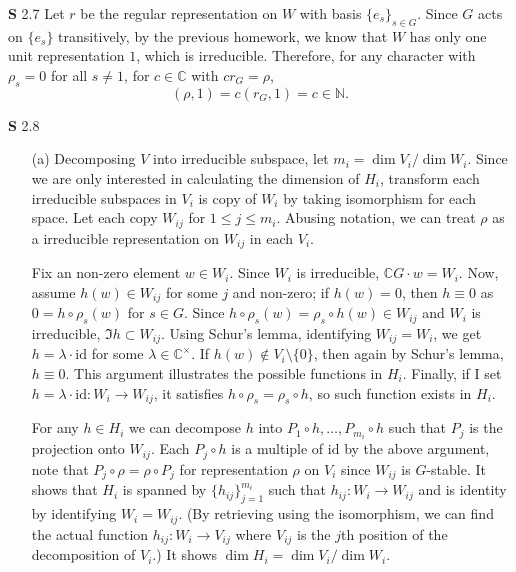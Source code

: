 \documentclass[a4paper, 12pt]{article}
\theoremstyle{Mydefinition}
\theoremstyle{Mytheorem}
\begin{document}
\noindent \textbf{S} 2.7
Let $r$ be the regular representation on $W$ with basis $\{e_s\}_{s\in G}$. Since $G$ acts on $\{e_s\}$ transitively, by the previous homework, we know that $W$ has only one unit representation $1$, which is irreducible. Therefore, for any character with $\rho_s = 0$ for all $s\neq 1$, for $c\in \mathbb{C}$ with $cr_G = \rho$,
\begin{equation}
    (\rho, 1) = c(r_G, 1) = c\in \mathbb{N}.
\end{equation}

\noindent \textbf{S} 2.8
\begin{enumerate}
    \item[(a)] Decomposing $V$ into irreducible subspace, let $m_i = \dim V_i/\dim W_i$. Since we are only interested in calculating the dimension of $H_i$, transform each irreducible subspaces in $V_i$ is copy of $W_i$ by taking isomorphism for each space. Let each copy $W_{ij}$ for $1\leq j\leq m_i$. Abusing notation, we can treat $\rho$ as a irreducible representation on $W_{ij}$ in each $V_i$.
    
    Fix an non-zero element $w\in W_i$. Since $W_i$ is irreducible, $\mathbb{C}G\cdot w = W_i$. Now, assume $h(w)\in W_{ij}$ for some $j$ and non-zero; if $h(w) = 0$, then $h\equiv 0$ as $0 = h\circ \rho_s(w)$ for $s\in G$. Since $h\circ \rho_s(w) = \rho_s\circ h(w)\in W_{ij}$ and $W_i$ is irreducible, $\Im h\subset W_{ij}$. Using Schur's lemma, identifying $W_{ij}=W_i$, we get $h= \lambda\cdot \mathrm{id}$ for some $\lambda\in \mathbb{C}^\times$. If $h(w)\not\in V_i\setminus \{0\}$, then again by Schur's lemma, $h\equiv 0$. This argument illustrates the possible functions in $H_i$. Finally, if I set $h=\lambda\cdot\mathrm{id}:W_i\rightarrow W_{ij}$, it satisfies $h\circ \rho_s = \rho_s\circ h$, so such function exists in $H_i$.
    
    For any $h\in H_i$ we can decompose $h$ into $P_1\circ h, \ldots, P_{m_i}\circ h$ such that $P_j$ is the projection onto $W_{ij}$. Each $P_{j}\circ h$ is a multiple of $\mathrm{id}$ by the above argument, note that $P_j\circ \rho = \rho\circ P_j$ for representation $\rho$ on $V_i$ since $W_{ij}$ is $G$-stable. It shows that $H_i$ is spanned by $\{h_{ij}\}_{j=1}^{m_i}$ such that $h_{ij}:W_i\rightarrow W_{ij}$ and is identity by identifying $W_i = W_{ij}$. (By retrieving using the isomorphism, we can find the actual function $h_{ij}:W_i\rightarrow V_{ij}$ where $V_{ij}$ is the $j$th position of the decomposition of $V_i$.) It shows $\dim H_i = \dim V_i/\dim W_i$.
    

\end{enumerate}
\end{document}

